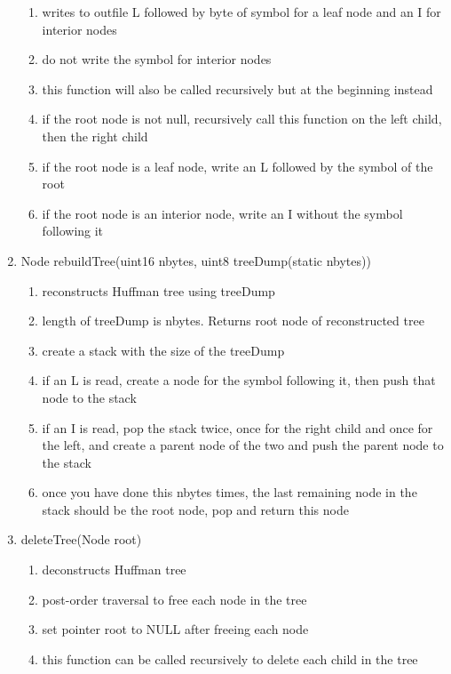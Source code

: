\documentclass[11pt]{article}
\begin{document}
\begin{enumerate}
	\begin{enumerate}
	\item writes to outfile L followed by byte of symbol for a leaf node and an I for interior nodes
	\item do not write the symbol for interior nodes
	\item this function will also be called recursively but at the beginning instead
	\item if the root node is not null, recursively call this function on the left child, then the right child
	\item if the root node is a leaf node, write an L followed by the symbol of the root
	\item if the root node is an interior node, write an I without the symbol following it
	\end{enumerate}
\item Node rebuildTree(uint16 nbytes, uint8 treeDump(static nbytes))
	\begin{enumerate}
	\item reconstructs Huffman tree using treeDump
	\item length of treeDump is nbytes. Returns root node of reconstructed tree
	\item create a stack with the size of the treeDump
	\item if an L is read, create a node for the symbol following it, then push that node to the stack
	\item if an I is read, pop the stack twice, once for the right child and once for the left, and create a parent node of the two and push the parent node to the stack
	\item once you have done this nbytes times, the last remaining node in the stack should be the root node, pop and return this node
	\end{enumerate}
\item deleteTree(Node root)
	\begin{enumerate}
	\item deconstructs Huffman tree
	\item post-order traversal to free each node in the tree
	\item set pointer root to NULL after freeing each node
	\item this function can be called recursively to delete each child in the tree
	\end{enumerate}
\end{enumerate}
\end{document}
